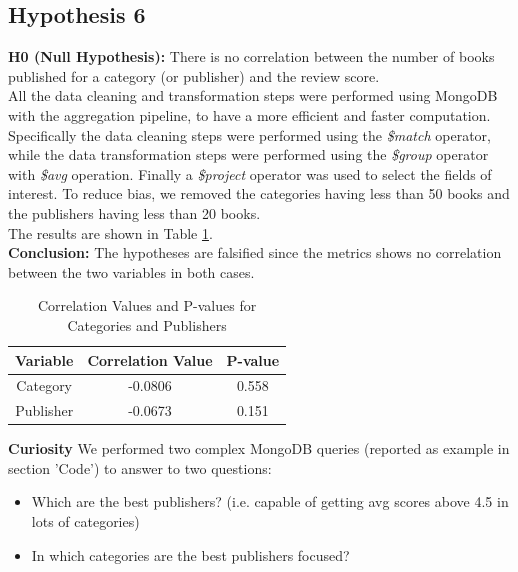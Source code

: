\subsection*{Hypothesis 6}

\textbf{H0 (Null Hypothesis):} There is no correlation between the number of books published for a category (or publisher) and the review score.\\
All the data cleaning and transformation steps were performed using MongoDB with the aggregation pipeline, to have a more efficient and faster computation.\\
Specifically the data cleaning steps were performed using the \textit{\$match} operator, while the data transformation steps were performed using the \textit{\$group} operator with \textit{\$avg} operation.
Finally a \textit{\$project} operator was used to select the fields of interest. To reduce bias, we removed the categories having less than 50 books and the publishers having less than 20 books.\\
The results are shown in Table \ref{tab:h6_correlations}.\\
\textbf{Conclusion:} The hypotheses are falsified since the metrics shows no correlation between the two variables in both cases.

\begin{table}[H]
    \centering
    \caption{Correlation Values and P-values for Categories and Publishers}
    \begin{tabular}{|c|c|c|}
    \hline
    \textbf{Variable} & \textbf{Correlation Value} & \textbf{P-value} \\
    \hline
    Category & -0.0806 & 0.558 \\
    \hline
    Publisher & -0.0673 & 0.151 \\
    \hline
    \end{tabular}
    \label{tab:h6_correlations}
\end{table}

\vspace{0.5cm}
\noindent 
\textbf{Curiosity}
We performed two complex MongoDB queries (reported as example in section 'Code') to answer to two questions:\\
\begin{itemize}
    \item Which are the best publishers? (i.e. capable of getting avg scores above 4.5 in lots of categories)
    \item In which categories are the best publishers focused?
\end{itemize}

